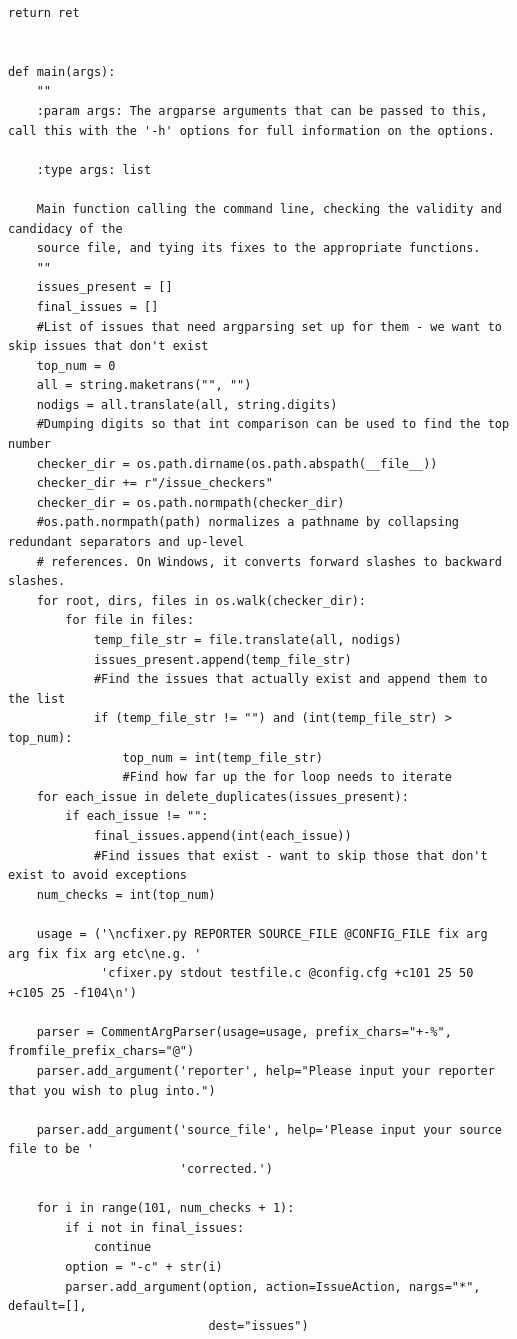 \documentclass[11pt]{scrreprt}
\begin{document}
\begin{lstlisting}[frame=single,basicstyle=\small]
    return ret


def main(args):
    ""
    :param args: The argparse arguments that can be passed to this, call this with the '-h' options for full information on the options.

    :type args: list

    Main function calling the command line, checking the validity and candidacy of the
    source file, and tying its fixes to the appropriate functions.
    ""
    issues_present = []
    final_issues = []
    #List of issues that need argparsing set up for them - we want to skip issues that don't exist
    top_num = 0
    all = string.maketrans("", "")
    nodigs = all.translate(all, string.digits)
    #Dumping digits so that int comparison can be used to find the top number
    checker_dir = os.path.dirname(os.path.abspath(__file__))
    checker_dir += r"/issue_checkers"
    checker_dir = os.path.normpath(checker_dir)
    #os.path.normpath(path) normalizes a pathname by collapsing redundant separators and up-level
    # references. On Windows, it converts forward slashes to backward slashes.
    for root, dirs, files in os.walk(checker_dir):
        for file in files:
            temp_file_str = file.translate(all, nodigs)
            issues_present.append(temp_file_str)
            #Find the issues that actually exist and append them to the list
            if (temp_file_str != "") and (int(temp_file_str) > top_num):
                top_num = int(temp_file_str)
                #Find how far up the for loop needs to iterate
    for each_issue in delete_duplicates(issues_present):
        if each_issue != "":
            final_issues.append(int(each_issue))
            #Find issues that exist - want to skip those that don't exist to avoid exceptions
    num_checks = int(top_num)

    usage = ('\ncfixer.py REPORTER SOURCE_FILE @CONFIG_FILE fix arg arg fix fix arg etc\ne.g. '
             'cfixer.py stdout testfile.c @config.cfg +c101 25 50 +c105 25 -f104\n')

    parser = CommentArgParser(usage=usage, prefix_chars="+-%", fromfile_prefix_chars="@")
    parser.add_argument('reporter', help="Please input your reporter that you wish to plug into.")

    parser.add_argument('source_file', help='Please input your source file to be '
                        'corrected.')

    for i in range(101, num_checks + 1):
        if i not in final_issues:
            continue
        option = "-c" + str(i)
        parser.add_argument(option, action=IssueAction, nargs="*", default=[],
                            dest="issues")


\end{lstlisting}
\end{document}
